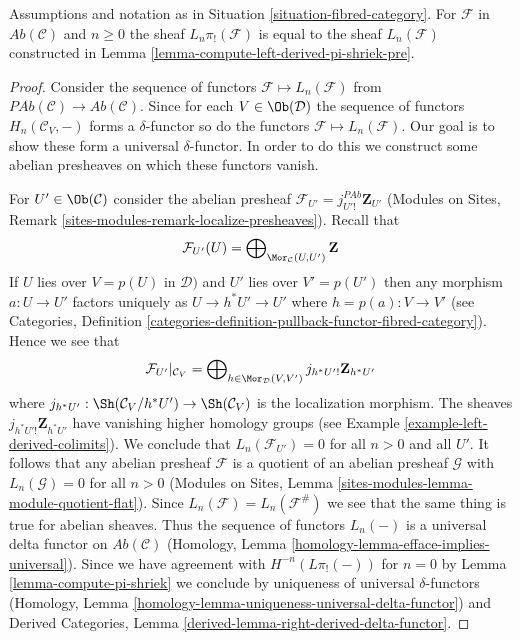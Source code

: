 \begin{lemma}
\label{lemma-compute-left-derived-pi-shriek}
Assumptions and notation as in Situation \ref{situation-fibred-category}.
For $\mathcal{F}$ in $\textit{Ab}(\mathcal{C})$ and $n \geq 0$
the sheaf $L_n\pi_!(\mathcal{F})$ is equal to the sheaf
$L_n(\mathcal{F})$ constructed in
Lemma \ref{lemma-compute-left-derived-pi-shriek-pre}.
\end{lemma}

\begin{proof}
Consider the sequence of functors $\mathcal{F} \mapsto L_n(\mathcal{F})$
from $\textit{PAb}(\mathcal{C}) \to \textit{Ab}(\mathcal{C})$.
Since for each $V \in \Ob(\mathcal{D})$ the sequence of functors
$H_n(\mathcal{C}_V, - )$ forms a $\delta$-functor
so do the functors $\mathcal{F} \mapsto L_n(\mathcal{F})$.
Our goal is to show these form a universal $\delta$-functor.
In order to do this we construct some abelian presheaves
on which these functors vanish.

\medskip\noindent
For $U' \in \Ob(\mathcal{C})$ consider the abelian presheaf
$\mathcal{F}_{U'} = j_{U'!}^{\textit{PAb}}\mathbf{Z}_{U'}$
(Modules on Sites, Remark \ref{sites-modules-remark-localize-presheaves}).
Recall that
$$
\mathcal{F}_{U'}(U) =
\bigoplus\nolimits_{\Mor_\mathcal{C}(U, U')} \mathbf{Z}
$$
If $U$ lies over $V = p(U)$ in $\mathcal{D})$ and $U'$ lies over $V' = p(U')$
then any morphism $a : U \to U'$ factors uniquely as $U \to h^*U' \to U'$
where $h = p(a) : V \to V'$ (see
Categories, Definition
\ref{categories-definition-pullback-functor-fibred-category}).
Hence we see that
$$
\mathcal{F}_{U'}|_{\mathcal{C}_V}
=
\bigoplus\nolimits_{h \in \Mor_\mathcal{D}(V, V')}
j_{h^*U'!}\mathbf{Z}_{h^*U'}
$$
where $j_{h^*U'} : \Sh(\mathcal{C}_V/h^*U') \to \Sh(\mathcal{C}_V)$
is the localization morphism. The sheaves $j_{h^*U'!}\mathbf{Z}_{h^*U'}$
have vanishing higher homology groups (see
Example \ref{example-left-derived-colimits}).
We conclude that $L_n(\mathcal{F}_{U'}) = 0$ for all $n > 0$ and all $U'$.
It follows that any abelian presheaf $\mathcal{F}$ is a quotient
of an abelian presheaf $\mathcal{G}$ with $L_n(\mathcal{G}) = 0$ for
all $n > 0$ (Modules on Sites, Lemma
\ref{sites-modules-lemma-module-quotient-flat}).
Since $L_n(\mathcal{F}) = L_n(\mathcal{F}^\#)$ we see
that the same thing is true for abelian sheaves. Thus
the sequence of functors $L_n(-)$ is a universal delta functor
on $\textit{Ab}(\mathcal{C})$
(Homology, Lemma \ref{homology-lemma-efface-implies-universal}).
Since we have agreement with
$H^{-n}(L\pi_!(-))$ for $n = 0$ by
Lemma \ref{lemma-compute-pi-shriek}
we conclude by uniqueness of universal $\delta$-functors
(Homology, Lemma \ref{homology-lemma-uniqueness-universal-delta-functor})
and
Derived Categories, Lemma \ref{derived-lemma-right-derived-delta-functor}.
\end{proof}


